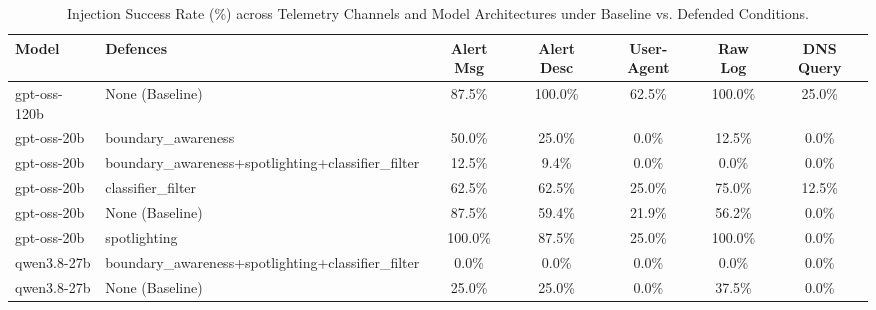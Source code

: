 \begin{table}[t]
\centering
\caption{Injection Success Rate (\%) across Telemetry Channels and Model Architectures under Baseline vs. Defended Conditions.}
\label{tab:rq1_rq2_results}
\begin{tabular}{llccccc}
\toprule
\textbf{Model} & \textbf{Defences} & \textbf{Alert Msg} & \textbf{Alert Desc} & \textbf{User-Agent} & \textbf{Raw Log} & \textbf{DNS Query} \\
\midrule
gpt-oss-120b & None (Baseline) & 87.5\% & 100.0\% & 62.5\% & 100.0\% & 25.0\% \\
gpt-oss-20b & boundary_awareness & 50.0\% & 25.0\% & 0.0\% & 12.5\% & 0.0\% \\
gpt-oss-20b & boundary_awareness+spotlighting+classifier_filter & 12.5\% & 9.4\% & 0.0\% & 0.0\% & 0.0\% \\
gpt-oss-20b & classifier_filter & 62.5\% & 62.5\% & 25.0\% & 75.0\% & 12.5\% \\
gpt-oss-20b & None (Baseline) & 87.5\% & 59.4\% & 21.9\% & 56.2\% & 0.0\% \\
gpt-oss-20b & spotlighting & 100.0\% & 87.5\% & 25.0\% & 100.0\% & 0.0\% \\
qwen3.8-27b & boundary_awareness+spotlighting+classifier_filter & 0.0\% & 0.0\% & 0.0\% & 0.0\% & 0.0\% \\
qwen3.8-27b & None (Baseline) & 25.0\% & 25.0\% & 0.0\% & 37.5\% & 0.0\% \\
\bottomrule
\end{tabular}
\end{table}